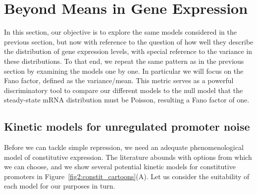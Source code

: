 \section{Beyond Means in Gene Expression}
\label{sec:beyond_means}
 
In this section, our objective is to explore the same models considered in the
previous section, but now with reference to the question of how well they
describe the distribution of gene expression levels, with special reference to
the variance in these distributions. To that end, we repeat the same pattern as
in the previous section by examining the models one by one. In particular we
will focus on the Fano factor, defined as the variance/mean. This metric serves
as a powerful discriminatory tool to compare our different models to the null
model that the steady-state mRNA distribution must be Poisson, resulting a Fano
factor of one.

\subsection{Kinetic models for unregulated promoter noise}

Before we can tackle simple repression, we need an adequate phenomenological
model of constitutive expression. The literature abounds with options from which
we can choose, and we show several potential kinetic models for constitutive
promoters in Figure~\ref{fig2:constit_cartoons}(A). Let us consider
the suitability of each model for our purposes in turn.

